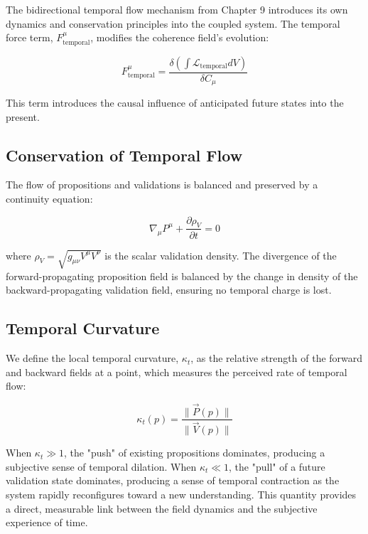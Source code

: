 The bidirectional temporal flow mechanism from Chapter 9 introduces its own dynamics and conservation principles into the coupled system. The temporal force term, \(F^\mu_{\text{temporal}}\), modifies the coherence field's evolution:

\begin{equation}
F^\mu_{\text{temporal}} = \frac{\delta(\int \mathcal{L}_{\text{temporal}} dV)}{\delta C_\mu}
\end{equation}

This term introduces the causal influence of anticipated future states into the present.


\subsection{Conservation of Temporal Flow}
\label{10.5.1:conservation_of_temporal_flow}

The flow of propositions and validations is balanced and preserved by a continuity equation:

\begin{equation}
\nabla_\mu P^\mu + \frac{\partial \rho_V}{\partial t} = 0
\end{equation}

where \(\rho_V = \sqrt{g_{\mu\nu} V^{\mu} V^{\nu}}\) is the scalar validation density. The divergence of the forward-propagating proposition field is balanced by the change in density of the backward-propagating validation field, ensuring no temporal charge is lost.


\subsection{Temporal Curvature}
\label{10.5.2:temporal_curvature}

We define the local temporal curvature, \(\kappa_t\), as the relative strength of the forward and backward fields at a point, which measures the perceived rate of temporal flow:

\begin{equation}
\kappa_t(p) = \frac{\|\vec{P}(p)\|}{\|\vec{V}(p)\|}
\end{equation}

When \(\kappa_t \gg 1\), the "push" of existing propositions dominates, producing a subjective sense of temporal dilation. When \(\kappa_t \ll 1\), the "pull" of a future validation state dominates, producing a sense of temporal contraction as the system rapidly reconfigures toward a new understanding. This quantity provides a direct, measurable link between the field dynamics and the subjective experience of time. 